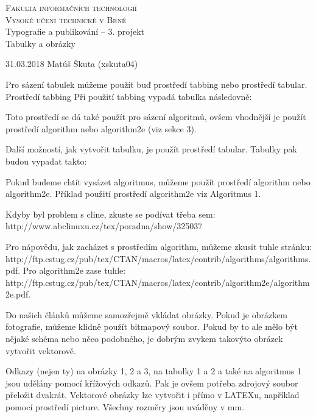 \documentclass[11pt, a4paper]{article}
\begin{document}
\begin{titlepage}

\thispagestyle{empty}
\begin{center}
\Huge
\textsc{Fakulta informačních technologií}\hspace{0.4em}\\
\textsc{Vysoké učení technické v Brně}\hspace{0.4em}\\
\LARGE{ Typografie a publikování – 3. projekt \hspace{0.3em}}\\
\Huge {Tabulky a obrázky}\hspace{0.3em}\\
\end{center}
\Large{31.03.2018 \hfill
Matúš Škuta (xskuta04)}
\end{titlepage}


Pro sázení tabulek můžeme použít buď prostředí tabbing nebo prostředí tabular.
Prostředí tabbing
Při použití tabbing vypadá tabulka následovně:

Toto prostředí se dá také použít pro sázení algoritmů, ovšem vhodnější je použít
prostředí algorithm nebo algorithm2e (viz sekce 3).

Další možností, jak vytvořit tabulku, je použít prostředí tabular. Tabulky pak
budou vypadat takto:

Pokud budeme chtít vysázet algoritmus, můžeme použít prostředí algorithm nebo algorithm2e.
Příklad použití prostředí algorithm2e viz Algoritmus 1.

Kdyby byl problem s cline, zkuste se podívat třeba sem:
http://www.abclinuxu.cz/tex/poradna/show/325037

Pro nápovědu, jak zacházet s prostředím algorithm, můžeme zkusit tuhle stránku:
http://ftp.cstug.cz/pub/tex/CTAN/macros/latex/contrib/algorithms/algorithms.pdf.
Pro algorithm2e zase tuhle:
http://ftp.cstug.cz/pub/tex/CTAN/macros/latex/contrib/algorithm2e/algorithm2e.pdf.

Do našich článků můžeme samozřejmě vkládat obrázky. Pokud je obrázkem fotografie,
můžeme klidně použít bitmapový soubor. Pokud by to ale mělo být nějaké schéma nebo
něco podobného, je dobrým zvykem takovýto obrázek vytvořit vektorově.

Odkazy (nejen ty) na obrázky 1, 2 a 3, na
tabulky 1 a 2 a také na algoritmus 1 jsou udělány pomocí
křížových odkazů. Pak je ovšem potřeba zdrojový soubor přeložit dvakrát.
Vektorové obrázky lze vytvořit i přímo v LATEXu, například pomocí prostředí
picture. Všechny rozměry jsou uváděny v mm.
\end{document}
